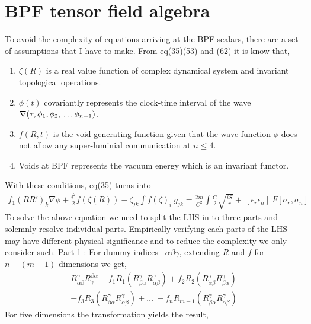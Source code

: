 \documentclass{article}
\begin{document}
\section{BPF tensor field algebra}
To avoid the complexity of equations arriving at the BPF scalars, there are a set of assumptions that I have to make. From eq(35)(53) and (62) it is know that, \begin{enumerate}
     \item $\zeta (R)$ is a real value function of complex dynamical system and invariant topological operations.
     \item $\phi(t)$ covariantly represents the clock-time interval of the wave $\nabla(\tau, \phi_1, \phi_2, \\ \dots \phi_{n-1} )$.
     \item $f(R,t)$ is the void-generating function given that the wave function $\phi$ does not allow any super-luminial communication at $n \leq 4$.
     \item Voids at BPF represents the vacuum energy which is an invariant functor.
 \end{enumerate}
 With these conditions, eq(35) turns into
 \begin{equation}
 \begin{split}
         f_1(RR')_k \nabla \phi + \frac{i^2}{2} f(\zeta(R)) - \zeta_{jk} \int f(\zeta)_i \ g_{jk} =  \frac{2m}{C^2} \int  \frac{G}{2} \sqrt{\frac{iS}{r}}+ \ [\epsilon_r \epsilon_n] \ F [\sigma_r ,\sigma_n]
 \end{split}
 \end{equation} 
 To solve the above equation we need to split the LHS in to three parts and solemnly resolve individual parts. Empirically verifying each parts of the LHS may have different physical significance and to reduce the complexity we only consider such.\vspace{5mm} \newline 
 Part 1 :  For dummy indices \ $\alpha \beta \gamma$, extending $R$ and $f$ for $n-(m-1)$ dimensions we get,
 \begin{equation}
 \begin{split}
         R_{\alpha \beta}^\gamma R_{\gamma}^{\beta \alpha} - f_1 R_1 (R_{\beta \alpha}^\gamma R_{\alpha \beta}^\gamma ) + f_2 R_2 (R_{\alpha \beta}^\gamma R_{\beta \alpha}^\gamma ) \\ - f_3 R_3 (R_{\beta \alpha}^\gamma R_{\alpha \beta}^\gamma ) + \dots \ - f_{n} R_{m-1} (R_{\beta \alpha}^\gamma R_{\alpha \beta}^\gamma )  
 \end{split}
 \end{equation} For five dimensions the transformation yields the result,
\end{document}
